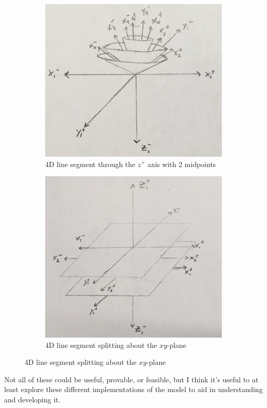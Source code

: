 \documentclass[20pt]{article} %
\begin{document}
\begin{figure}[!htbp]
  	\centering
   	\begin{subfigure}[!p]{0.5\linewidth}
	\centering
    	\includegraphics[width=\linewidth]{./figures/fig7.jpg}
	\caption{4D line segment through the $z^{+}$ axis with 2 midpoints}
	\label{fig:sub1}
   	\end{subfigure}
  	\centering
   	\begin{subfigure}[!p]{0.47\linewidth}
	\centering
    	\includegraphics[width=\linewidth]{./figures/fig8.jpg}
	\caption{4D line segment splitting about the $xy$-plane}
	\label{fig:sub1}
   	\end{subfigure}
\end{figure} 


Not all of these could be useful, provable, or feasible, but I think it's useful to at least explore these different implementations of the model to aid in understanding and developing it.
\end{document}
